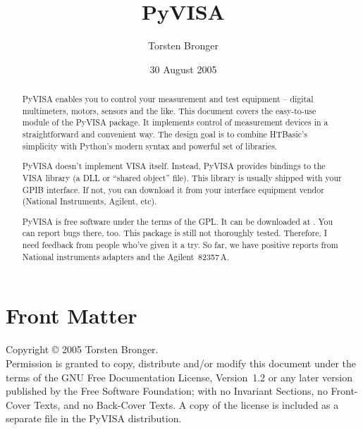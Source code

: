 \documentclass{howto}
\title{PyVISA}
\author{Torsten Bronger}
\date{30 August 2005}
\begin{document}
\maketitle

\ifhtml
\chapter*{Front Matter\label{front}}
\fi

Copyright \copyright{} 2005 Torsten Bronger.\\
Permission is granted to copy, distribute and/or modify this document under the
terms of the GNU Free Documentation License, Version~1.2 or any later version
published by the Free Software Foundation; with no Invariant Sections, no
Front-Cover Texts, and no Back-Cover Texts.  A copy of the license is included
as a separate file  in the PyVISA distribution.

\begin{abstract}

\noindent
PyVISA enables you to control your measurement and test equipment -- digital
multimeters, motors, sensors and the like.  This document covers the
easy-to-use  module of the PyVISA package.  It implements control
of measurement devices in a straightforward and convenient way.  The design
goal is to combine HTBasic's simplicity with Python's modern syntax and
powerful set of libraries.

PyVISA doesn't implement VISA itself.  Instead, PyVISA provides bindings to the
VISA library (a DLL or ``shared object'' file).  This library is usually
shipped with your GPIB interface.  If not, you can download it from your
interface equipment vendor (National Instruments, Agilent, etc).

PyVISA is free software under the terms of the GPL\@.  It can be downloaded at
.  You can
report bugs there, too.  This package is still not thoroughly tested.
Therefore, I need feedback from people who've given it a try.  So far, we have
positive reports from National instruments adapters and the Agilent~82357\,A\@.
\end{abstract}

\begin{samepage}
  \tableofcontents
\end{samepage}

\end{document}

